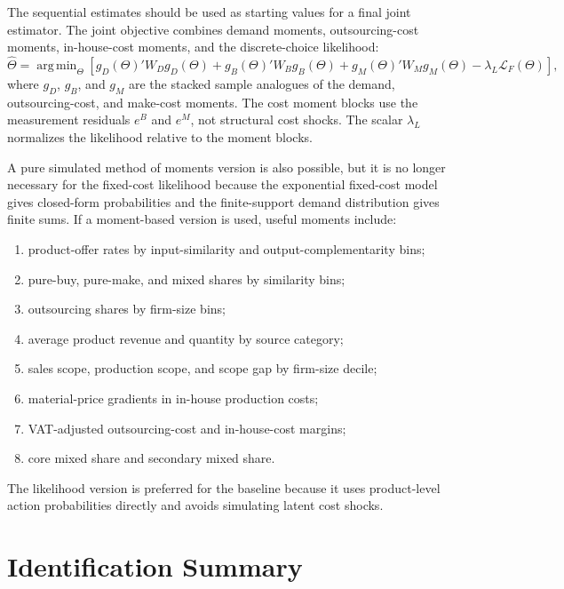 \documentclass[11pt,a4paper]{article}
\newcommand{\mc}{\mathcal}
\DeclareMathOperator*{\argmin}{arg\,min}
\begin{document}
The sequential estimates should be used as starting values for a final joint estimator. The joint objective combines demand moments, outsourcing-cost moments, in-house-cost moments, and the discrete-choice likelihood:
\begin{equation}
    \widehat\Theta
    =\argmin_{\Theta}
    \left[
        g_D(\Theta)'W_Dg_D(\Theta)
        +g_B(\Theta)'W_Bg_B(\Theta)
        +g_M(\Theta)'W_Mg_M(\Theta)
        -\lambda_L\mc{L}_F(\Theta)
    \right],
    \label{eq:joint_objective}
\end{equation}
where $g_D$, $g_B$, and $g_M$ are the stacked sample analogues of the demand, outsourcing-cost, and make-cost moments. The cost moment blocks use the measurement residuals $e^B$ and $e^M$, not structural cost shocks. The scalar $\lambda_L$ normalizes the likelihood relative to the moment blocks.

A pure simulated method of moments version is also possible, but it is no longer necessary for the fixed-cost likelihood because the exponential fixed-cost model gives closed-form probabilities and the finite-support demand distribution gives finite sums. If a moment-based version is used, useful moments include:
\begin{enumerate}
    \item product-offer rates by input-similarity and output-complementarity bins;
    \item pure-buy, pure-make, and mixed shares by similarity bins;
    \item outsourcing shares by firm-size bins;
    \item average product revenue and quantity by source category;
    \item sales scope, production scope, and scope gap by firm-size decile;
    \item material-price gradients in in-house production costs;
    \item VAT-adjusted outsourcing-cost and in-house-cost margins;
    \item core mixed share and secondary mixed share.
\end{enumerate}
The likelihood version is preferred for the baseline because it uses product-level action probabilities directly and avoids simulating latent cost shocks.

\section{Identification Summary}
\end{document}

